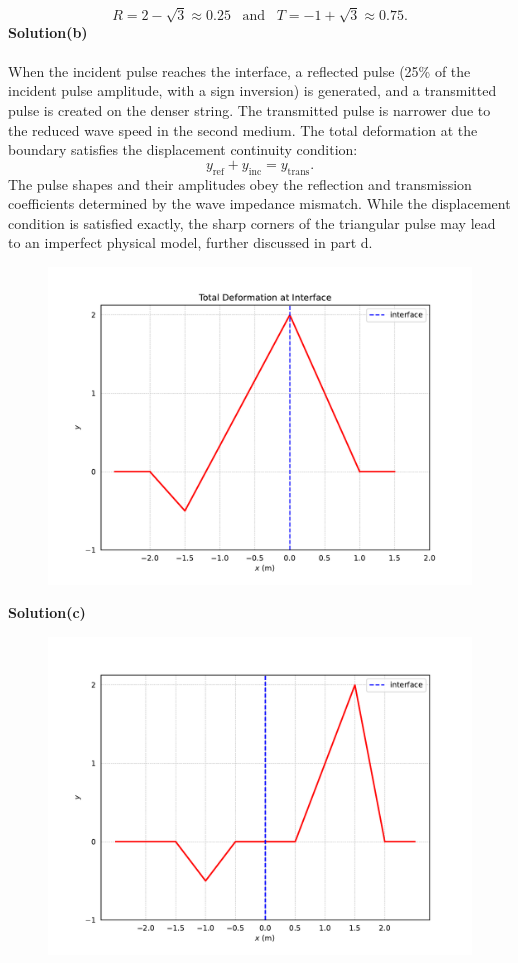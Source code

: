 \documentclass[12pt,a4paper]{article}
\begin{document}
\[R=2-\sqrt{3}\approx0.25\,\,\,\,\,\text{and}\,\,\,\,\, T=-1+\sqrt{3}\approx0.75.\]
\textbf{Solution(b)}
\\
\\When the incident pulse reaches the interface, a reflected pulse (25\% of the incident pulse amplitude, with a sign inversion) is generated, and a transmitted pulse is created on the denser string. The transmitted pulse is narrower due to the reduced wave speed in the second medium. The total deformation at the boundary satisfies the displacement continuity condition:
\[y_\text{ref}+y_{\text{inc}}=y_{\text{trans}}.\]
The pulse shapes and their amplitudes obey the reflection and transmission coefficients determined by the wave impedance mismatch. While the displacement condition is satisfied exactly, the sharp corners of the triangular pulse may lead to an imperfect physical model, further discussed in part d.
\begin{figure}[H]
    \centering
    \includegraphics[width=0.9\linewidth]{figs/fig_sol_4.3b.pdf}
    \end{figure}
\textbf{Solution(c)}
\begin{figure}[H]
    \centering
    \includegraphics[width=0.9\linewidth]{figs/fig_sol_4.3c.pdf}
\end{figure}
\end{document}

